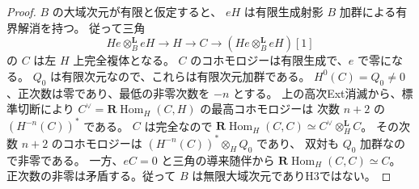 \begin{proof}
$B$ の大域次元が有限と仮定すると、
$eH$ は有限生成射影 $B$ 加群による有界解消を持つ。
従って三角
\[
 He\otimes_B^{\mathbf L}eH\longrightarrow H\longrightarrow C
 \longrightarrow (He\otimes_B^{\mathbf L}eH)[1]
\]
の $C$ は左 $H$ 上完全複体となる。
$C$ のコホモロジーは有限生成で、$e$ で零になる。
$Q_0$ は有限次元なので、これらは有限次元加群である。
$H^0(C)=Q_0\ne0$、正次数は零であり、最低の非零次数を $-n$ とする。
上の高次Ext消滅から、標準切断により
$C^\vee=\mathbf R\operatorname{Hom}_H(C,H)$ の最高コホモロジーは
次数 $n+2$ の $(H^{-n}(C))^*$ である。
$C$ は完全なので $\mathbf R\operatorname{Hom}_H(C,C)\simeq
C^\vee\otimes_H^{\mathbf L}C$。
その次数 $n+2$ のコホモロジーは
$(H^{-n}(C))^*\otimes_H Q_0$ であり、
双対も $Q_0$ 加群なので非零である。
一方、$eC=0$ と三角の導来随伴から
$\mathbf R\operatorname{Hom}_H(C,C)\simeq C$。
正次数の非零は矛盾する。従って $B$ は無限大域次元でありH3ではない。
\end{proof}

